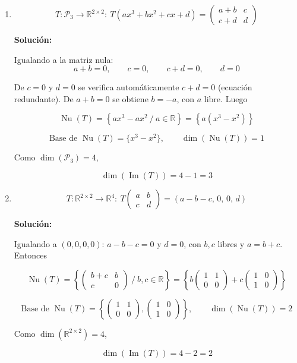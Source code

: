 \documentclass[12pt]{article}
\newcommand{\solucion}{%
    \vspace{0.8em}%
    \textbf{Solución:}%
    \vspace{0.8em}%
}
\begin{document}
\begin{enumerate}[label=\alph*.-]
    Como $\dim(\mathbb{R}^{2\times2})=4$,

    \[
    \boxed{\dim(\operatorname{Im}(T))=4-1=3}
    \]


    \item
    \[
    T:\mathcal{P}_3\to\mathbb{R}^{2\times2}:\
    T(ax^3+bx^2+cx+d)=\begin{pmatrix}a+b&c\\c+d&d\end{pmatrix}
    \]

    \solucion

    Igualando a la matriz nula:
    \[
    a+b=0,\qquad c=0,\qquad c+d=0,\qquad d=0
    \]

    De $c=0$ y $d=0$ se verifica automáticamente $c+d=0$ (ecuación
    redundante). De $a+b=0$ se obtiene $b=-a$, con $a$ libre. Luego

    \[
    \operatorname{Nu}(T)=\left\{ax^3-ax^2\ /\ a\in\mathbb{R}\right\}
    =\left\{a(x^3-x^2)\right\}
    \]

    \[
    \boxed{
    \text{Base de }\operatorname{Nu}(T)=\{x^3-x^2\},
    \qquad \dim(\operatorname{Nu}(T))=1
    }
    \]

    Como $\dim(\mathcal{P}_3)=4$,

    \[
    \boxed{\dim(\operatorname{Im}(T))=4-1=3}
    \]


    \item
    \[
    T:\mathbb{R}^{2\times2}\to\mathbb{R}^4:\
    T\begin{pmatrix}a&b\\c&d\end{pmatrix}=(a-b-c,\,0,\,0,\,d)
    \]

    \solucion

    Igualando a $(0,0,0,0)$: $a-b-c=0$ y $d=0$, con $b,c$ libres y
    $a=b+c$. Entonces

    \[
    \operatorname{Nu}(T)=\left\{\begin{pmatrix}b+c&b\\c&0\end{pmatrix}\ /\ b,c\in\mathbb{R}\right\}
    =\left\{b\begin{pmatrix}1&1\\0&0\end{pmatrix}+c\begin{pmatrix}1&0\\1&0\end{pmatrix}\right\}
    \]

    \[
    \boxed{
    \text{Base de }\operatorname{Nu}(T)=\left\{\begin{pmatrix}1&1\\0&0\end{pmatrix},
    \begin{pmatrix}1&0\\1&0\end{pmatrix}\right\},
    \qquad \dim(\operatorname{Nu}(T))=2
    }
    \]

    Como $\dim(\mathbb{R}^{2\times2})=4$,

    \[
    \boxed{\dim(\operatorname{Im}(T))=4-2=2}
    \]

\end{enumerate}
\end{document}

